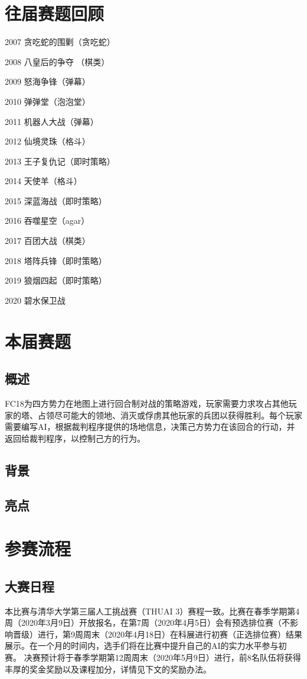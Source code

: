 \documentclass[a4paper,4pt]{article}
\begin{document}
\section{往届赛题回顾}
2007 贪吃蛇的围剿（贪吃蛇）\par
2008 八皇后的争夺 （棋类）\par
2009 怒海争锋（弹幕）\par
2010 弹弹堂（泡泡堂）\par
2011 机器人大战（弹幕）\par
2012 仙境灵珠（格斗）\par
2013 王子复仇记（即时策略）\par
2014 天使羊（格斗）\par
2015 深蓝海战（即时策略）\par
2016 吞噬星空（agar）\par
2017 百团大战（棋类）\par
2018 塔阵兵锋（即时策略）\par
2019 狼烟四起（即时策略）\par
2020 碧水保卫战\par
\section{本届赛题}
\subsection{概述}
FC18为四方势力在地图上进行回合制对战的策略游戏，玩家需要力求攻占其他玩家的塔、占领尽可能大的领地、消灭或俘虏其他玩家的兵团以获得胜利。每个玩家需要编写AI，根据裁判程序提供的场地信息，决策己方势力在该回合的行动，并返回给裁判程序，以控制己方的行为。
\subsection{背景}
\subsection{亮点}


\section{参赛流程}
\subsection{大赛日程}
本比赛与清华大学第三届人工挑战赛（THUAI 3）赛程一致。比赛在春季学期第4周（2020年3月9日）开放报名，在第7周（2020年4月5日）会有预选排位赛（不影响晋级）进行，第9周周末（2020年4月18日）在科展进行初赛（正选排位赛）结果展示。在一个月的时间内，选手们将在比赛中提升自己的AI的实力水平参与初赛。
决赛预计将于春季学期第12周周末（2020年5月9日）进行，前8名队伍将获得丰厚的奖金奖励以及课程加分，详情见下文的奖励办法。
\end{document}
